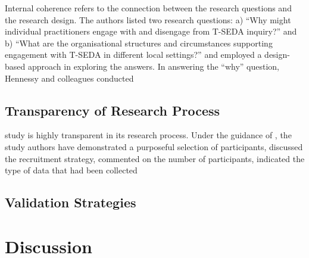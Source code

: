 \documentclass[
        a4paper, %
        12pt, %
        stu, %
        donotrepeattitle, %
        floatsintext, %
        biblatex, %
        twoside, %
        colorlinks=true,        %
        linkcolor=red,          %
        anchorcolor=red,      %
        citecolor=blue,         %
        urlcolor=blue,          %
        bookmarks=true,         %
        bookmarksopen=false,    %
        bookmarksnumbered=true,  %
        dvipsnames
]{apa7}
\begin{document}
Internal coherence refers to the connection between the research questions and the research design. The authors listed two research questions: a) ``Why might individual practitioners engage with and disengage from T-SEDA inquiry?'' and b) ``What are the organisational structures and circumstances supporting engagement with T-SEDA in different local settings?'' and employed a design-based approach in exploring the answers. In answering the ``why'' question, Hennessy and colleagues conducted

\subsection{Transparency of Research Process} %

 study is highly transparent in its research process. Under the guidance of \textcite[][pp. 185--187]{creswell:2018}, the study authors have demonstrated a purposeful selection of participants, discussed the recruitment strategy, commented on the number of participants, indicated the type of data that had been collected

\subsection{Validation Strategies} %

\section{Discussion} %

\printbibliography
\end{document}
